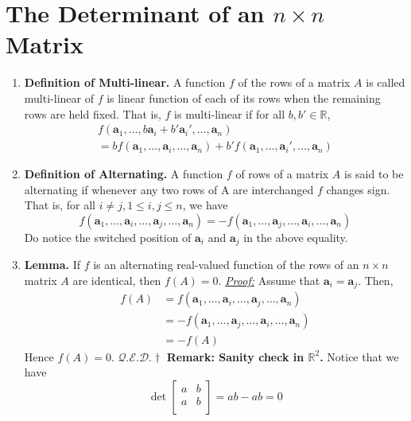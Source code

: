 \documentclass[oneside, 12pt]{book}
\newcommand{\settag}[1]{\renewcommand{\theenumi}{#1}}
\newcommand{\R}{\mathbb{R}}
\newcommand{\qed}{\hfill $\mathcal{Q}.\mathcal{E}.\mathcal{D}.\dagger$}
\newcommand{\tbf}[1]{\textbf{#1}}
\newcommand{\tit}[1]{\textit{#1}}
\newcommand{\proof}{\tit{\underline{Proof:}}} %
\newcommand{\para}[1]{\item \tbf{#1}}
\newcommand{\va}{\mathbf{a}}
\begin{document}
\section{The Determinant of an $n \times n$ Matrix}
\begin{enumerate}
    \settag{3.2.1}
    \para{Definition of Multi-linear.} A function $f$ of the rows of a matrix $A$ is called multi-linear of $f$ is linear function of each of its rows when the remaining rows are held fixed. That is, $f$ is multi-linear if for all $b, b' \in \R$,
    \begin{multline*}
        f(\va_1,\ldots,b\va_i + b'\va_i',\ldots,\va_n) \\
        = bf(\va_1,\ldots,\va_i,\ldots,\va_n) + b'f(\va_1,\ldots,\va_i',\ldots,\va_n)
    \end{multline*}
    
    \settag{3.2.2}
    \para{Definition of Alternating.} A function $f$ of rows of a matrix $A$ is said to be alternating if whenever any two rows of A are interchanged $f$ changes sign. That is, for all $i\neq j, 1\leq i, j \leq n$, we have
    \begin{equation*}
        f(\va_1,\ldots,\va_i,\ldots,\va_j,\ldots,\va_n) = -f(\va_1,\ldots,\va_j,\ldots,\va_i,\ldots,\va_n)
    \end{equation*}
    Do notice the switched position of $\va_i$ and $\va_j$ in the above equality.
    
    \settag{3.2.2}
    \para{Lemma.} If $f$ is an alternating real-valued function of the rows of an $n\times n$ matrix $A$ are identical, then $f(A) = 0$. \newline
    \proof \newline
    Assume that $\va_i = \va_j$. Then,
    \begin{align*}
        f(A) &= f(\va_1,\ldots,\va_i,\ldots,\va_j,\ldots,\va_n) \\
        &= -f(\va_1,\ldots,\va_j,\ldots,\va_i,\ldots,\va_n) \\
        &= -f(A)
    \end{align*}
    Hence $f(A) = 0$. \qed \newline
    \textbf{Remark: Sanity check in $\R^2$.} Notice that we have
    \begin{equation*}
        \det
        \begin{bmatrix}
            a & b \\
            a & b \\
        \end{bmatrix}
        =ab-ab = 0
    \end{equation*}
    

\end{enumerate}
\end{document}
